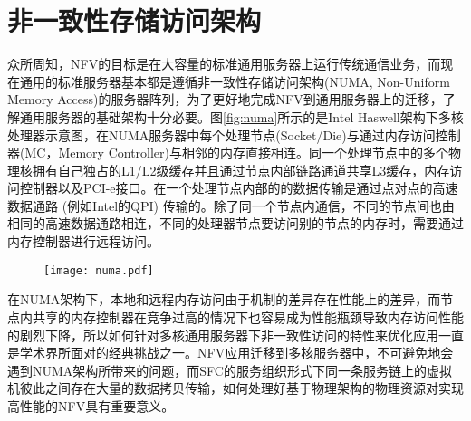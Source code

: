 \section{非一致性存储访问架构}
众所周知，NFV的目标是在大容量的标准通用服务器上运行传统通信业务，而现在通用的标准服务器基本都是遵循非一致性存储访问架构(NUMA, Non-Uniform Memory Access)的服务器阵列，为了更好地完成NFV到通用服务器上的迁移，了解通用服务器的基础架构十分必要。图\ref{fig:numa}所示的是Intel Haswell架构下多核处理器示意图，在NUMA服务器中每个处理节点(Socket/Die)与通过内存访问控制器(MC，Memory Controller)与相邻的内存直接相连。同一个处理节点中的多个物理核拥有自己独占的L1/L2级缓存并且通过节点内部链路通道共享L3缓存，内存访问控制器以及PCI-e接口。在一个处理节点内部的的数据传输是通过点对点的高速数据通路 (例如Intel的QPI) 传输的。除了同一个节点内通信，不同的节点间也由相同的高速数据通路相连，不同的处理器节点要访问别的节点的内存时，需要通过内存控制器进行远程访问。
\begin{figure}[!htp]
	\centering
	\texttt{[image: numa.pdf]}
\end{figure}
在NUMA架构下，本地和远程内存访问由于机制的差异存在性能上的差异，而节点内共享的内存控制器在竞争过高的情况下也容易成为性能瓶颈导致内存访问性能的剧烈下降，所以如何针对多核通用服务器下非一致性访问的特性来优化应用一直是学术界所面对的经典挑战之一。NFV应用迁移到多核服务器中，不可避免地会遇到NUMA架构所带来的问题，而SFC的服务组织形式下同一条服务链上的虚拟机彼此之间存在大量的数据拷贝传输，如何处理好基于物理架构的物理资源对实现高性能的NFV具有重要意义。
\begin{figure}[!htp]
	\centering
\end{figure}
